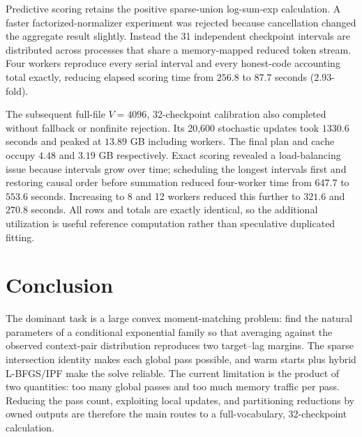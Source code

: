 \documentclass[11pt]{article}
\begin{document}
Predictive scoring retains the positive sparse-union log-sum-exp calculation.
A faster factorized-normalizer experiment was rejected because cancellation
changed the aggregate result slightly.  Instead the 31 independent
checkpoint intervals are distributed across processes that share a
memory-mapped reduced token stream.  Four workers reproduce every serial
interval and every honest-code accounting total exactly, reducing elapsed
scoring time from $256.8$ to $87.7$ seconds ($2.93$-fold).

The subsequent full-file $V=4096$, 32-checkpoint calibration also completed
without fallback or nonfinite rejection.  Its 20,600 stochastic updates
took $1330.6$ seconds and peaked at $13.89$ GB including workers.  The final
plan and cache occupy $4.48$ and $3.19$ GB respectively.  Exact scoring
revealed a load-balancing issue because intervals grow over time; scheduling
the longest intervals first and restoring causal order before summation
reduced four-worker time from $647.7$ to $553.6$ seconds.  Increasing to 8
and 12 workers reduced this further to $321.6$ and $270.8$ seconds.  All
rows and totals are exactly identical, so the additional utilization is
useful reference computation rather than speculative duplicated fitting.

\section{Conclusion}

The dominant task is a large convex moment-matching problem: find the
natural parameters of a conditional exponential family so that averaging
against the observed context-pair distribution reproduces two target--lag
margins.  The sparse intersection identity makes each global pass possible,
and warm starts plus hybrid L-BFGS/IPF make the solve reliable.  The current
limitation is the product of two quantities: too many global passes and too
much memory traffic per pass.  Reducing the pass count, exploiting local
updates, and partitioning reductions by owned outputs are therefore the
main routes to a full-vocabulary, 32-checkpoint calculation.
\end{document}
